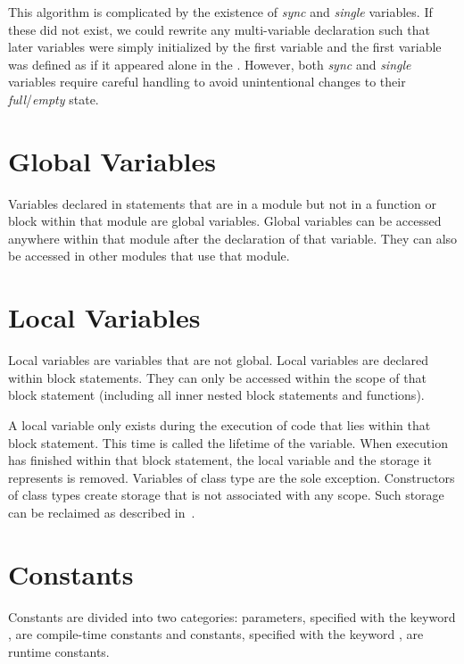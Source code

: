 \begin{rationale}
This algorithm is complicated by the existence of \emph{sync}
and \emph{single} variables.  If these did not exist, we could rewrite
any multi-variable declaration such that later variables were simply
initialized by the first variable and the first variable was defined
as if it appeared alone in the .  However,
both \emph{sync} and \emph{single} variables require careful handling
to avoid unintentional changes to their \emph{full}/\emph{empty}
state.
\end{rationale}

\section{Global Variables}
\label{Global_Variables}

Variables declared in statements that are in a module but not in a
function or block within that module are global variables.  Global
variables can be accessed anywhere within that module after the
declaration of that variable.  They can also be accessed in other
modules that use that module.

\section{Local Variables}
\label{Local_Variables}

Local variables are variables that are not global.  Local variables
are declared within block statements.  They can only be accessed
within the scope of that block statement (including all inner nested
block statements and functions).

A local variable only exists during the execution of code that lies
within that block statement.  This time is called the lifetime of the
variable.  When execution has finished within that block statement,
the local variable and the storage it represents is removed.
Variables of class type are the sole exception.  Constructors of class
types create storage that is not associated with any scope.  Such
storage can be reclaimed as described
in~.

\section{Constants}
\label{Constants}

Constants are divided into two categories: parameters, specified with
the keyword , are compile-time constants and constants,
specified with the keyword , are runtime constants.

